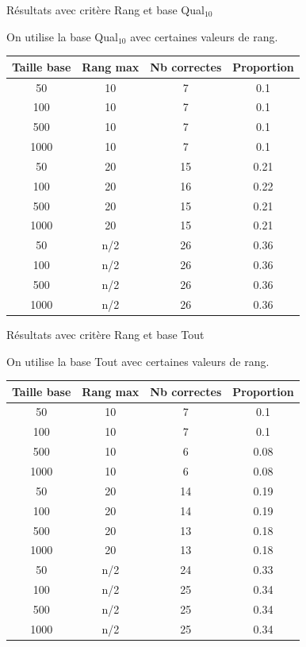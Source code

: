 \documentclass{beamer}
\begin{document}
\begin{frame}{Résultats avec critère Rang et base Qual$_{10}$}

On utilise la base Qual$_{10}$ avec certaines valeurs de rang.
\begin{tabular}{|c|c|c|c|}
   \hline
   Taille base & Rang max & Nb correctes & Proportion\\
   \hline
   50 & 10  & 7 & 0.1  \\
   \hline
   100 & 10  & 7 & 0.1  \\
   \hline
   500 & 10  & 7 & 0.1  \\
   \hline
   1000 & 10 & 7 & 0.1  \\
   \hline
   \hline
   50 & 20  & 15 & 0.21  \\
   \hline
   100 & 20 & 16 & 0.22  \\
   \hline
   500 & 20 & 15 & 0.21  \\
   \hline
   1000 & 20 & 15 & 0.21  \\
   \hline
   \hline
   50 & n/2 & 26 & 0.36  \\
   \hline
   100 & n/2 & 26 & 0.36  \\
   \hline
   500 & n/2 & 26 & 0.36  \\
   \hline
   1000 & n/2 & 26 & 0.36  \\
   \hline
\end{tabular}
\end{frame}

\begin{frame}{Résultats avec critère Rang et base Tout}

On utilise la base Tout avec certaines valeurs de rang.
\begin{tabular}{|c|c|c|c|}
   \hline
   Taille base & Rang max & Nb correctes & Proportion\\
   \hline
   50 & 10  & 7 & 0.1  \\
   \hline
   100 & 10  & 7 & 0.1  \\
   \hline
   500 & 10  & 6 & 0.08  \\
   \hline
   1000 & 10 & 6 & 0.08  \\
   \hline
   \hline
   50 & 20  & 14 & 0.19  \\
   \hline
   100 & 20 & 14 & 0.19  \\
   \hline
   500 & 20 & 13 & 0.18  \\
   \hline
   1000 & 20 & 13 & 0.18  \\
   \hline
   \hline
   50 & n/2 & 24 & 0.33  \\
   \hline
   100 & n/2 & 25 & 0.34  \\
   \hline
   500 & n/2 & 25 & 0.34  \\
   \hline
   1000 & n/2 & 25 & 0.34  \\
   \hline
\end{tabular}
\end{frame}
\end{document}

